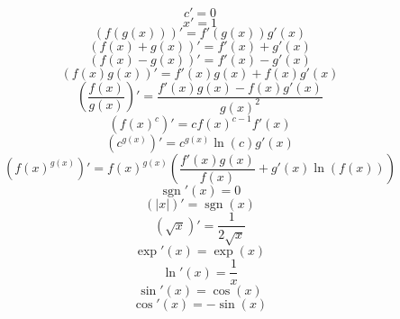 \documentclass{article}
\DeclareMathOperator{\sgn}{sgn}
\begin{document}
    \begin{equation}
        c'=0
    \end{equation}
    \begin{equation}
        x'=1
    \end{equation}
    \begin{equation}
        (f(g(x)))'=f'(g(x))g'(x)
    \end{equation}
    \begin{equation}
        (f(x)+g(x))'=f'(x)+g'(x)
    \end{equation}
    \begin{equation}
        (f(x)-g(x))'=f'(x)-g'(x)
    \end{equation}
    \begin{equation}
        (f(x)g(x))'=f'(x)g(x)+f(x)g'(x)
    \end{equation}
    \begin{equation}
        \left(\frac{f(x)}{g(x)}\right)'=\frac{f'(x)g(x)-f(x)g'(x)}{g(x)^2}
    \end{equation}
    \begin{equation}
        \left(f(x)^c\right)'=cf(x)^{c-1}f'(x)
    \end{equation}
    \begin{equation}
        \left(c^{g(x)}\right)'=c^{g(x)}\ln(c)g'(x)
    \end{equation}
    \begin{equation}
        \left(f(x)^{g(x)}\right)'=f(x)^{g(x)}\left(\frac{f'(x)g(x)}{f(x)}+g'(x)\ln(f(x))\right)
    \end{equation}
    \begin{equation}
        \sgn'(x)=0
    \end{equation}
    \begin{equation}
        (|x|)'=\sgn(x)
    \end{equation}
    \begin{equation}
        (\sqrt{x})'=\frac{1}{2\sqrt{x}}
    \end{equation}
    \begin{equation}
        \exp'(x)=\exp(x)
    \end{equation}
    \begin{equation}
        \ln'(x)=\frac{1}{x}
    \end{equation}
    \begin{equation}
        \sin'(x)=\cos(x)
    \end{equation}
    \begin{equation}
        \cos'(x)=-\sin(x)
    \end{equation}
\end{document}
